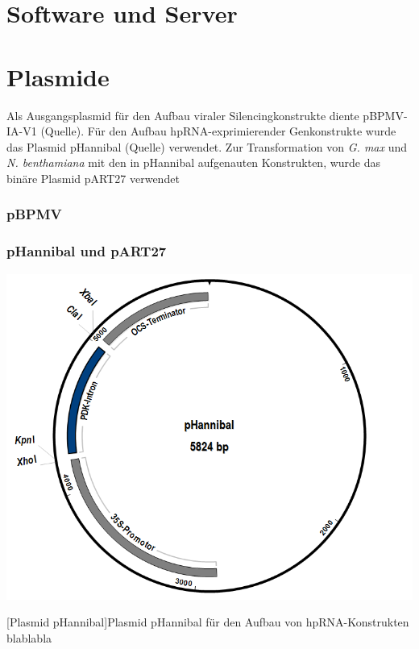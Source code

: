 \section{Software und Server}


\section{Plasmide}
Als Ausgangsplasmid für den Aufbau viraler Silencingkonstrukte diente pBPMV-IA-V1 (Quelle). Für den Aufbau  hpRNA-exprimierender Genkonstrukte wurde das Plasmid pHannibal (Quelle) verwendet. Zur Transformation von \textit{G. max} und \textit{N. benthamiana} mit den in pHannibal aufgenauten Konstrukten,  wurde das binäre Plasmid pART27 verwendet  

\subsubsection*{pBPMV}

\subsubsection*{pHannibal und pART27}
\begin{center}
\includegraphics[scale=.3]{MaterialMethoden/Abb/pHannibalgb1}
\end{center}
[Plasmid pHannibal]{Plasmid pHannibal für den Aufbau von hpRNA-Konstrukten\\ \footnotesize blablabla}
\par


